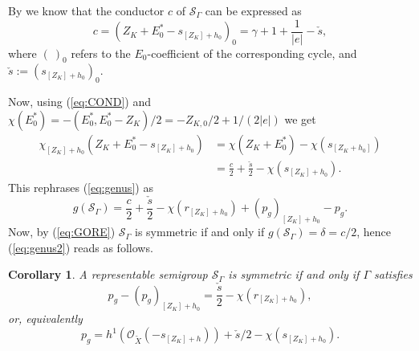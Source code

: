 \documentclass[12pt,a4paper]{amsart}
\def\cS{{\mathcal S}}
\def\cO{\mathcal{O}}
\newtheorem{cor}{Corollary}[section]
\theoremstyle{remark}
\theoremstyle{definition}
\begin{document}
 By \cite{stronglyflat} we know that the conductor $c$ of $\cS_\Gamma$ can be expressed as 
\begin{equation}\label{eq:COND}
    c=(Z_K+E_0^*-s_{[Z_K]+h_0})_0=\gamma+1+\frac{1}{|e|}-\check{s},
\end{equation}
where $( \ )_{0}$ refers to the $E_0$-coefficient of the corresponding cycle, and $\check{s}:=(s_{[Z_K]+h_0})_0$.



Now, using (\ref{eq:COND}) and $\chi(E^*_0)=-(E^*_0, E^*_0-Z_K)/2= 
-Z_{K,0}/2+1/(2|e|)$ we get 
\begin{equation}\begin{split}
\chi_{[Z_K]+h_0}(Z_K+E_0^*-s_{[Z_K]+h_0})&= \chi(Z_K+E^*_0)-\chi(s_{[Z_K+h_0]})\\
&=\frac{c}{2}+\frac{\check{s}}{2}-\chi(s_{[Z_K]+h_0}).
\end{split}
\end{equation}
This rephrases (\ref{eq:genus}) as 
\begin{equation}\label{eq:genus2}
g(\cS_\Gamma)=\frac{c}{2}+\frac{\check{s}}{2}-\chi(r_{[Z_K]+h_0})+(p_g)_{[Z_K]+h_0}-p_g.
\end{equation}
Now, by (\ref{eq:GORE}) $\cS_\Gamma$ is symmetric if and only if $g(\cS_\Gamma)=\delta=c/2$, 
hence (\ref{eq:genus2}) reads as follows. 
\begin{cor} A representable semigroup $\cS_\Gamma$ is symmetric if and only if $\Gamma$ satisfies 
\begin{equation}
p_g-(p_g)_{[Z_K]+h_0}=\frac{\check{s}}{2}-\chi(r_{[Z_K]+h_0}), 
\end{equation}
or, equivalently
\begin{equation}
p_g=h^1(\cO_{{\tilde X}}(-s_{[Z_K]+h}))+\check{s}/2 - \chi(s_{[Z_K]+h_0}).
\end{equation}
\end{cor}
\end{document}
